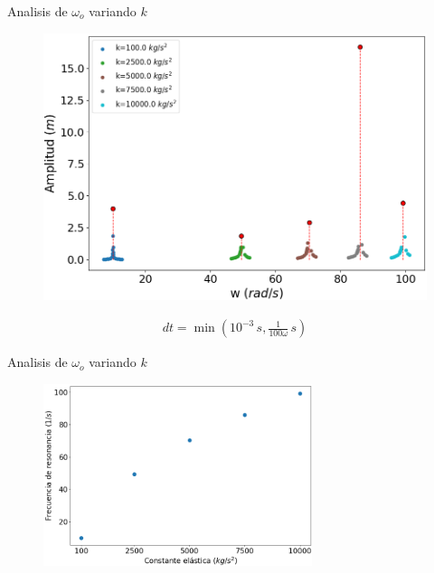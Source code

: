 \begin{frame}{Analisis de $\omega_o$ variando $k$}
    \begin{minipage}[c]{0.7\linewidth}
        \begin{figure}[H]
            \centering
            \includegraphics[width=1\textwidth]{pic/05-results/amp_w_k}
            \label{fig:amp_w_k}
        \end{figure}
    \end{minipage}
    \begin{minipage}[c]{0.29\linewidth}
        \begin{equation*}
            \begin{aligned}
                dt = \min\left(10^{-3}\,s, \frac{1}{100 \omega}\,s\right)
            \end{aligned}
        \end{equation*}
    \end{minipage}
\end{frame}

\begin{frame}{Analisis de $\omega_o$ variando $k$}
        \begin{figure}[H]
            \centering
            \includegraphics[width=0.7\textwidth]{pic/05-results/w_k}
            \label{fig:w_k}
        \end{figure}
\end{frame}

